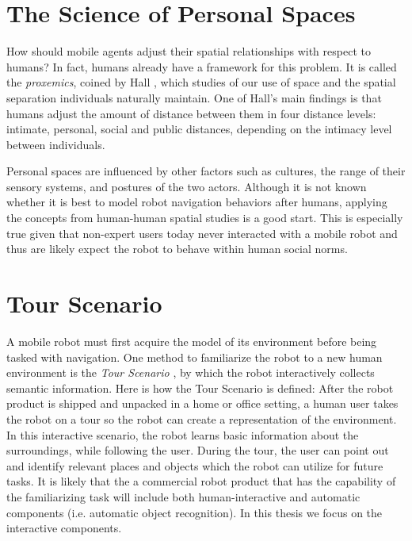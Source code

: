 \section{The Science of Personal Spaces}
\label{sec:personal_spaces}

How should mobile agents adjust their spatial relationships with respect to humans? In fact, humans already have a framework for this problem. It is called the \textit{proxemics}, coined by Hall \cite{hall1966hidden}, which studies of our use of space and the spatial separation individuals naturally maintain. One of Hall's main findings is that humans adjust the amount of distance between them in four distance levels: intimate, personal, social and public distances, depending on the intimacy level between individuals.

Personal spaces are influenced by other factors such as cultures, the range of their sensory systems, and postures of the two actors. Although it is not known whether it is best to model robot navigation behaviors after humans, applying the concepts from human-human spatial studies is a good start. This is especially true given that non-expert users today never interacted with a mobile robot and thus are likely expect the robot to behave within human social norms.

\section{Tour Scenario}
\label{sec:tour_scenario}

A mobile robot must first acquire the model of its environment before being tasked with navigation. One method to familiarize the robot to a new human environment is the \textit{Tour Scenario} \cite{topp2008human}, by which the robot interactively collects semantic information. Here is how the Tour Scenario is defined: After the robot product is shipped and unpacked in a home or office setting, a human user takes the robot on a tour so the robot can create a representation of the environment. In this interactive scenario, the robot learns basic information about the surroundings, while following the user. During the tour, the user can point out and identify relevant places and objects which the robot can utilize for future tasks. It is likely that the a commercial robot product that has the capability of the familiarizing task will include both human-interactive and automatic components (i.e. automatic object recognition). In this thesis we focus on the interactive components.

